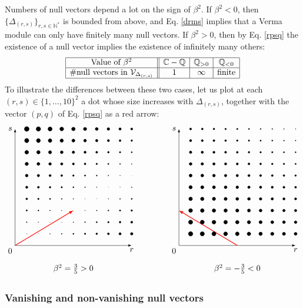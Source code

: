 \documentclass[12pt, a4paper]{article}
\theoremstyle{break}
\begin{document}
 Numbers of null vectors depend a lot on the sign of $\beta^2$. If $\beta^2<0$, then $\{\Delta_{(r, s)}\}_{r,s\in\mathbb{N}^*}$ is bounded from above, and Eq. \eqref{drms} implies that a Verma module can only have finitely many null vectors. If $\beta^2>0$, then by Eq. \eqref{rpsq} the existence of a null vector implies the existence of infinitely many others: 
\begin{align}
 \begin{array}{|c||c|c|c|}
  \hline 
  \text{Value of }\beta^2 & \mathbb{C}-\mathbb{Q} & \mathbb{Q}_{>0} & \mathbb{Q}_{<0}
  \\
  \hline 
  \#\text{null vectors in } \mathcal{V}_{\Delta_{(r, s)}} & 1 & \infty & \text{finite} 
  \\
  \hline 
 \end{array}
\end{align}
To illustrate the differences between these two cases, let us plot at each $(r,s)\in \{1,\dots, 10\}^2$ a dot whose size increases with 
$\Delta_{(r,s)}$, together with the vector $(p, q)$ of Eq. \eqref{rpsq} as a red arrow:
\begin{align}
 \begin{tikzpicture}[baseline=(base), scale = .5]
 \coordinate (base) at (0, 4);
  \draw[latex-latex] (0, 10) node [left] {$s$} -- (0, 0) node[below left] {$0$} -- (10, 0) node [below] {$r$};
  \draw[thick, red, -latex] (0, 0) -- (5, 3);
  \foreach \r in {1,...,10}{
  \foreach \s in {1,...,10}{
  \pgfmathsetmacro{\myrad}{.2+.12*abs(3*\r-5*\s)}
  \filldraw (\r, \s) circle [radius = \myrad pt];
  }}
  \node at (5, -2) {$\beta^2 = \frac35>0$};
 \end{tikzpicture}
 \qquad \qquad
 \begin{tikzpicture}[baseline=(base), scale = .5]
 \coordinate (base) at (0, 4);
  \draw[latex-latex] (0, 10) node [left] {$s$} -- (0, 0) node[below left] {$0$} -- (10, 0) node [below] {$r$};
  \draw[thick, red, -latex] (5, 0) -- (0, 3);
  \foreach \r in {1,...,10}{
  \foreach \s in {1,...,10}{
  \pgfmathsetmacro{\myrad}{6-(3*\r+5*\s)/15}
  \filldraw (\r, \s) circle [radius = \myrad pt];
  }}
  \node at (5, -2) {$\beta^2 = -\frac35<0$};
 \end{tikzpicture}
\end{align}

\subsubsection{Vanishing and non-vanishing null vectors}
\end{document}
